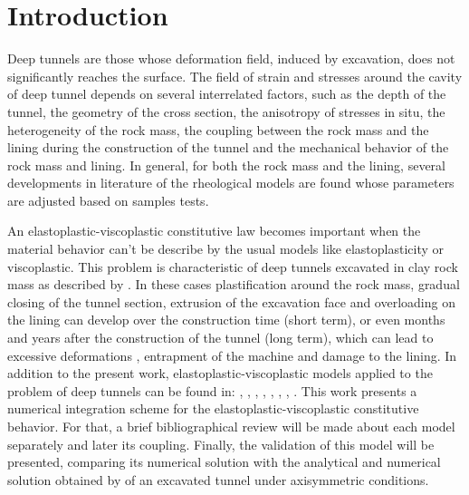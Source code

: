 \documentclass[Journal,letterpaper]{ascelike-new}
\begin{document}
\section{Introduction}
Deep tunnels are those whose deformation field, induced by excavation, does not significantly reaches the surface. The field of strain and stresses around the cavity of deep tunnel depends on several interrelated factors, such as the depth of the tunnel, the geometry of the cross section, the anisotropy of stresses in situ, the heterogeneity of the rock mass, the coupling between the rock mass and the lining during the construction of the tunnel and the mechanical behavior of the rock mass and lining. In general, for both the rock mass and the lining, several developments in literature of the rheological models are found whose parameters are adjusted based on samples tests.

An elastoplastic-viscoplastic constitutive law becomes important when the material behavior can’t be describe by the usual models like elastoplasticity or viscoplastic. This problem is characteristic of deep tunnels excavated in clay rock mass as described by . In these cases plastification around the rock mass, gradual closing of the tunnel section, extrusion of the excavation face and overloading on the lining can develop over the construction time (short term), or even months and years after the construction of the tunnel (long term), which can lead to excessive deformations \cite{barla2008}, entrapment of the machine \cite{ramoni2010} and damage to the lining.
In addition to the present work, elastoplastic-viscoplastic models applied to the problem of deep tunnels can be found in: , , , , , , , .
This work presents a numerical integration scheme for the elastoplastic-viscoplastic constitutive behavior.
For that, a brief bibliographical review will be made about each model separately and later its coupling.
Finally, the validation of this model will be presented, comparing its numerical solution with the analytical and numerical solution obtained by  of an excavated tunnel under axisymmetric conditions.
\end{document}
